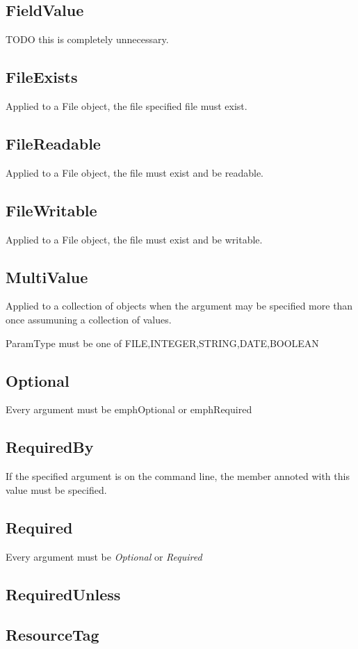 \documentclass[a4paper,10pt]{article}
\begin{document}
\subsection{FieldValue}
TODO this is completely unnecessary.
\subsection{FileExists}
Applied to a File object, the file specified file must exist.
\subsection{FileReadable}
Applied to a File object, the file must exist and be readable. 
\subsection{FileWritable}
Applied to a File object, the file must exist and be writable.
\subsection{MultiValue}
Applied to a collection of objects when the argument may be specified more than once assumuning a collection of values.

ParamType must be one of FILE,INTEGER,STRING,DATE,BOOLEAN

\subsection{Optional}
Every argument must be emph{Optional} or emph{Required}
\subsection{RequiredBy}
If the specified argument is on the command line, the member annoted with this value must be specified.
\subsection{Required}
Every argument must be \emph{Optional} or \emph{Required}
\subsection{RequiredUnless}
\subsection{ResourceTag}
\end{document}
